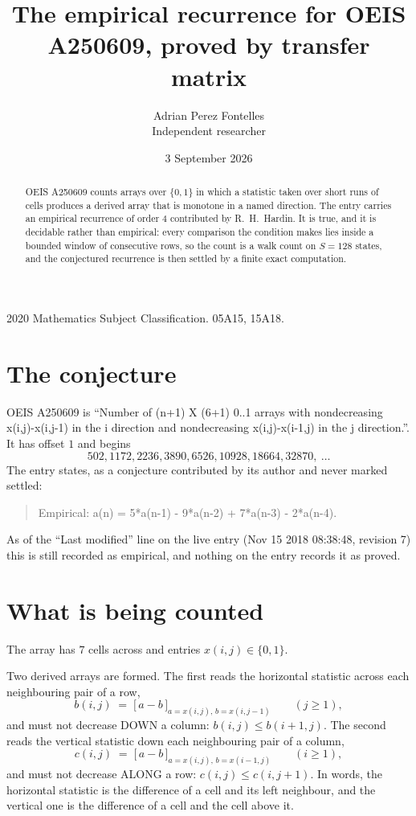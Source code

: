 \documentclass[11pt,a4paper]{article}
\title{The empirical recurrence for OEIS A250609, proved by transfer matrix}
\author{Adrian Perez Fontelles\\ \small Independent researcher}
\date{3 September 2026}
\theoremstyle{plain}
\theoremstyle{definition}
\begin{document}
\maketitle

\begin{abstract}
OEIS A250609 counts arrays over $\{0,1\}$ in which a statistic taken over short runs
of cells produces a derived array that is monotone in a named direction. The entry carries an
empirical recurrence of order $4$ contributed by R.~H.~Hardin. It is true, and it is
decidable rather than empirical: every comparison the condition makes lies inside a bounded
window of consecutive rows, so the count is a walk count on $S=128$ states, and the
conjectured recurrence is then settled by a finite exact computation.
\end{abstract}

\noindent\small 2020 Mathematics Subject Classification. 05A15, 15A18.\normalsize

\section{The conjecture}

OEIS A250609 is ``Number of (n+1) X (6+1) 0..1 arrays with nondecreasing x(i,j)-x(i,j-1) in the i direction and nondecreasing x(i,j)-x(i-1,j) in the j direction.''. It has offset $1$ and begins
\[
502, 1172, 2236, 3890, 6526, 10928, 18664, 32870,\ \dots
\]
The entry states, as a conjecture contributed by its author and never marked settled:
\begin{quote}
Empirical: a(n) = 5*a(n-1) - 9*a(n-2) + 7*a(n-3) - 2*a(n-4).
\end{quote}
As of the ``Last modified'' line on the live entry (Nov 15 2018 08:38:48, revision 7) this is still
recorded as empirical, and nothing on the entry records it as proved.

\section{What is being counted}

The array has $7$ cells across and entries $x(i,j)\in\{0,1\}$.

Two derived arrays are formed. The first reads the horizontal statistic across each
neighbouring pair of a row,
\[
b(i,j)\;=\;\bigl[\,a-b\,\bigr]_{a=x(i,j),\,b=x(i,j-1)}\qquad (j\ge1),
\]
and must not decrease DOWN a column: $b(i,j)\le b(i{+}1,j)$. The second reads the vertical
statistic down each neighbouring pair of a column,
\[
c(i,j)\;=\;\bigl[\,a-b\,\bigr]_{a=x(i,j),\,b=x(i{-}1,j)}\qquad (i\ge1),
\]
and must not decrease ALONG a row: $c(i,j)\le c(i,j{+}1)$. In words, the horizontal statistic
is the difference of a cell and its left neighbour, and the vertical one is
the difference of a cell and the cell above it.
\end{document}

